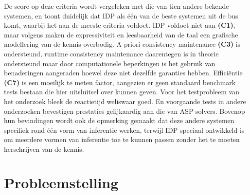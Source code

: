 De score op deze criteria wordt vergeleken met die van tien andere bekende systemen, en toont duidelijk dat IDP als \'{e}\'{e}n van de beste systemen uit de bus komt, waarbij het aan de meeste criteria voldoet. IDP voldoet niet aan \textbf{(C1)}, maar volgens \citep{van2016kb} maken de expressiviteit en leesbaarheid van de taal een grafische modellering van de kennis overbodig. 
A priori consistency maintenance \textbf{(C3)} is ondersteund, runtime consistency maintenance daarentegen is in theorie ondersteund maar door computationele beperkingen is het gebruik van benaderingen aangeraden hoewel deze niet dezelfde garanties hebben.
Effici\"{e}ntie \textbf{(C7)} is een moeilijk te meten factor, aangezien er geen standaard benchmark tests bestaan die hier uitsluitsel over kunnen geven. Voor het testprobleem van het onderzoek bleek de reactietijd weliswaar goed. En voorgaande tests in andere onderzoeken bevestigen prestaties gelijkaardig aan die van ASP solvers. 
Bovenop hun bevindingen wordt ook de opmerking gemaakt dat deze andere systemen specifiek rond \'{e}\'{e}n vorm van inferentie werken, terwijl IDP speciaal ontwikkeld is om meerdere vormen van inferentie toe te kunnen passen zonder het te moeten herschrijven van de kennis.

\section{Probleemstelling}


